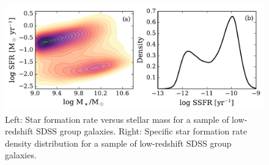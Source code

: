 \begin{figure}[!ht]
  \centering
  \includegraphics[width=\textwidth]{m_sfr.pdf}
  \caption[SFR versus stellar mass (left) and SSFR distribution
    (right) for SDSS group galaxies]{Left: Star formation rate versus stellar mass for a sample
    of low-redshift SDSS group galaxies.  Right: Specific star
    formation rate density distribution for a sample of low-redshift
    SDSS group galaxies.}
  \label{fig:m_sfr}
\end{figure}

